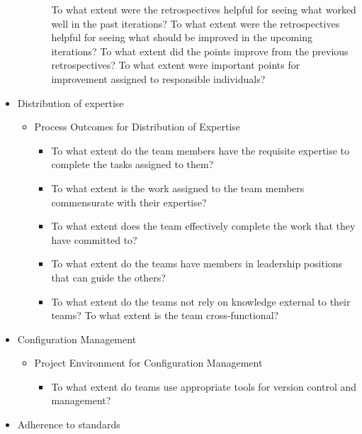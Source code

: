 \begin{appendices}
\begin{itemize}
\begin{itemize}
\begin{itemize}
					\addition To what extent were the retrospectives helpful for seeing what worked well in the past iterations?
					\addition To what extent were the retrospectives helpful for seeing what should be improved in the upcoming iterations?
					\addition To what extent did the points improve from the previous retrospectives?
				\addition To what extent were important points for improvement assigned to responsible individuals?
				\end{itemize}	 
		\end{itemize}
	\item Distribution of expertise 
		\begin{itemize}
			\item Process Outcomes for Distribution of Expertise
				\begin{itemize}
					\item To what extent do the team members have the requisite expertise to complete the tasks assigned to them? 
					\item To what extent is the work assigned to the team members commensurate with their expertise? 
					\item To what extent does the team effectively complete the work that they have committed to? 
					\item To what extent do the teams have members in leadership positions that can guide the others? 
					\item To what extent do the teams not rely on knowledge external to their teams? 
					\addition To what extent is the team cross-functional?
				\end{itemize}
		\end{itemize}
	\item Configuration Management
		\begin{itemize}
			\item Project Environment for Configuration Management
				\begin{itemize}
					\item To what extent do teams use appropriate tools for version control and management?
				\end{itemize}
		\end{itemize}
	\item Adherence to standards
		\begin{itemize}

\end{itemize}
\end{itemize}
\end{appendices}
